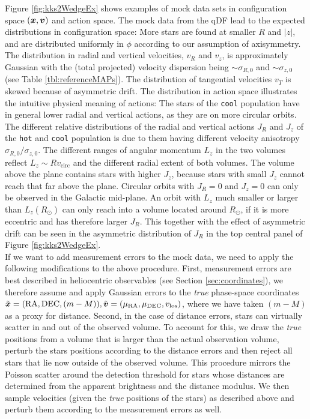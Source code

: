 Figure \ref{fig:kks2WedgeEx} shows examples of mock data sets in configuration space $(\boldsymbol{x},\boldsymbol{v})$ and action space. The mock data from the qDF lead to the expected distributions in configuration space: More stars are found at smaller $R$ and $|z|$, and are distributed uniformly in $\phi$ according to our assumption of axisymmetry. The distribution in radial and vertical velocities, $v_R$ and $v_z$, is approximately Gaussian with the (total projected) velocity dispersion being $\sim\sigma_{R,0}$ and $\sim\sigma_{z,0}$ (see Table \ref{tbl:referenceMAPs}). The distribution of tangential velocities $v_T$ is skewed because of asymmetric drift. The distribution in action space illustrates the intuitive physical meaning of actions: The stars of the \texttt{cool} population have in general lower radial and vertical actions, as they are on more circular orbits. The different relative distributions of the radial and vertical actions $J_R$ and $J_z$ of the \texttt{hot} and \texttt{cool} population is due to them having different velocity anisotropy $\sigma_{R,0}/\sigma_{z,0}$. The different ranges of angular momentum $L_z$ in the two volumes reflect $L_z \sim R  v_\text{circ}$ and the different radial extent of both volumes. The volume above the plane contains stars with higher $J_z$, because stars with small $J_z$ cannot reach that far above the plane. Circular orbits with $J_R = 0$ and $J_z = 0$ can only be observed in the Galactic mid-plane. An orbit with $L_z$ much smaller or larger than $L_z(R_\odot)$ can only reach into a volume located around $R_\odot$, if it is more eccentric and has therefore larger $J_R$. This together with the effect of asymmetric drift can be seen in the asymmetric distribution of $J_R$ in the top central panel of Figure \ref{fig:kks2WedgeEx}.\\

If we want to add measurement errors to the mock data, we need to apply the following modifications to the above procedure. First, measurement errors are best described in heliocentric observables (see Section \ref{sec:coordinates}), we therefore assume and apply Gaussian errors to the \emph{true} phase-space coordinates $\tilde{\boldsymbol{x}} = (\text{RA},\text{DEC},(m-M)), \tilde{\boldsymbol{v}} = (\mu_\text{RA},\mu_\text{DEC},v_\text{los})$, where we have taken $(m-M)$ as a proxy for distance. Second, in the case of distance errors, stars can virtually scatter in and out of the observed volume. To account for this, we draw the \emph{true} positions from a volume that is larger than the actual observation volume, perturb the stars positions according to the distance errors and then reject all stars that lie now outside of the observed volume. This procedure mirrors the Poisson scatter around the detection threshold for stars whose distances are determined from the apparent brightness and the distance modulus. We then sample velocities (given the \emph{true} positions of the stars) as described above and perturb them according to the measurement errors as well.

